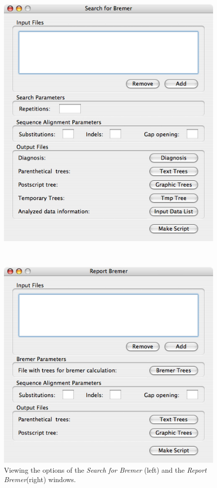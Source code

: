 {\begin{figure}
\centering
\begin{minipage}[c]{0.45\textwidth}
\includegraphics[width=\textwidth]{doc/figures/searchforbremer_window.jpg}
\end{minipage}
\,
\begin{minipage}[c]{0.52\textwidth}
\includegraphics[width=\textwidth]{doc/figures/reportbremer_window.jpg}
\end{minipage}
\caption{Viewing the options of the \emph{Search for Bremer} (left) and the \emph{Report Bremer}(right) windows.}
\label{fig:search_report_bremer}
\end{figure}

}
